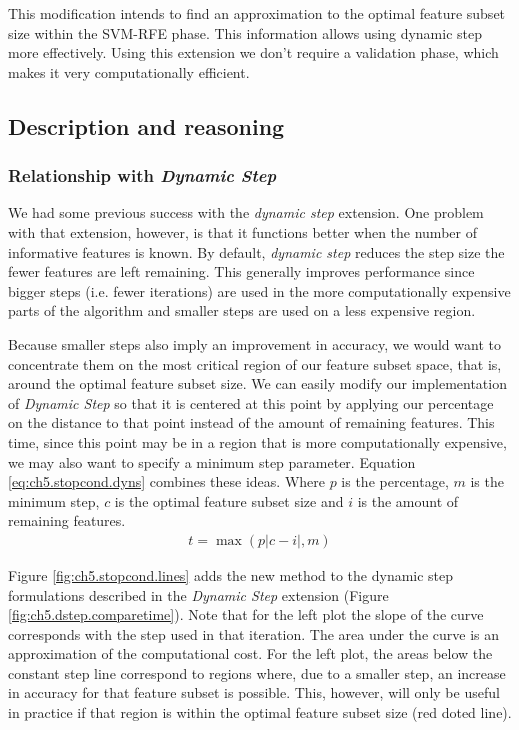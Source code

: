 This modification intends to find an approximation to the optimal feature subset size within the SVM-RFE phase. This information allows using dynamic step more effectively. Using this extension we don't require a validation phase, which makes it very computationally efficient.

\subsection{Description and reasoning}
\label{sec:ch5.stopcond.desc}

\subsubsection*{Relationship with \emph{Dynamic Step}}

We had some previous success with the \emph{dynamic step} extension. One problem with that extension, however, is that it functions better when the number of informative features is known. By default, \emph{dynamic step} reduces the step size the fewer features are left remaining. This generally improves performance since bigger steps (i.e. fewer iterations) are used in the more computationally expensive parts of the al\-go\-rithm and smaller steps are used on a less expensive region. 

Because smaller steps also imply an improvement in accuracy, we would want to concentrate them on the most critical region of our feature subset space, that is, around the optimal feature subset size. We can easily modify our implementation of \emph{Dynamic Step} so that it is centered at this point by applying our percentage on the distance to that point instead of the amount of remaining features. This time, since this point may be in a region that is more computationally expensive, we may also want to specify a minimum step parameter. Equation \ref{eq:ch5.stopcond.dyns} combines these ideas. Where $p$ is the percentage, $m$ is the minimum step, $c$ is the optimal feature subset size and $i$ is the amount of remaining features.
\begin{align}
    t = \max(p|c-i|, m)
    \label{eq:ch5.stopcond.dyns}
\end{align}

Figure \ref{fig:ch5.stopcond.lines} adds the new method to the dynamic step formulations described in the \emph{Dynamic Step} extension (Figure \ref{fig:ch5.dstep.comparetime}). Note that for the left plot the slope of the curve corresponds with the step used in that iteration. The area under the curve is an approximation of the computational cost. For the left plot, the areas below the constant step line correspond to regions where, due to a smaller step, an increase in accuracy for that feature subset is possible. This, however, will only be useful in practice if that region is within the optimal feature subset size (red doted line).

